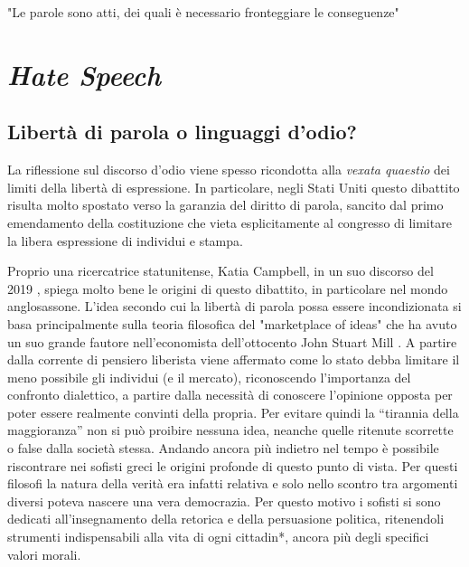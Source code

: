 
\begin{savequote}[75mm]
"Le parole sono atti, dei quali è necessario fronteggiare le conseguenze"
\end{savequote}

\chapter{\textit{Hate Speech}}
\label{chap:hate}

\section{Libertà di parola o linguaggi d'odio?}
La riflessione sul discorso d’odio viene spesso ricondotta alla \textit{vexata quaestio} dei limiti della libertà di espressione. In particolare, negli Stati Uniti questo dibattito risulta molto spostato verso la garanzia del diritto di parola, sancito dal primo emendamento della costituzione che vieta esplicitamente al congresso di limitare la libera espressione di individui e stampa.

Proprio una ricercatrice statunitense, Katia Campbell, in un suo discorso del 2019 \citep{campbell2019}, spiega molto bene le origini di questo dibattito, in particolare nel mondo anglosassone. L'idea secondo cui la libertà di parola possa essere incondizionata si basa principalmente sulla teoria filosofica del "marketplace of ideas" che ha avuto un suo grande fautore nell'economista dell'ottocento John Stuart Mill \citep{mill1859}. A partire dalla corrente di pensiero liberista viene affermato come lo stato debba limitare il meno possibile gli individui (e il mercato), riconoscendo l'importanza del confronto dialettico, a partire dalla necessità di conoscere l'opinione opposta per poter essere realmente convinti della propria. Per evitare quindi la “tirannia della maggioranza” non si può proibire nessuna idea, neanche quelle ritenute scorrette o false dalla società stessa. Andando ancora più indietro nel tempo è possibile riscontrare nei sofisti greci le origini profonde di questo punto di vista. Per questi filosofi la natura della verità era infatti relativa e solo nello scontro tra argomenti diversi poteva nascere una vera democrazia. Per questo motivo i sofisti si sono dedicati all'insegnamento della retorica e della persuasione politica, ritenendoli strumenti indispensabili alla vita di ogni cittadin*, ancora più degli specifici valori morali.

